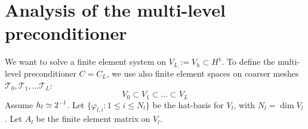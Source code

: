 








% 

\section{Analysis of the multi-level preconditioner}

We want to solve a finite element system on $V_L := V_h \subset H^1$.
To define the multi-level preconditioner $C = C_L$, we use also finite
element spaces on coarser meshes ${\mathcal T}_0, {\mathcal T}_1, \ldots
{\mathcal T}_L$:
$$
V_0 \subset V_1 \subset \ldots \subset V_L
$$
Assume $h_l \simeq 2^{-l}$. Let $\{ \varphi_{l,i} : 1 \leq i \leq N_l \}$ be the hat-basis for $V_l$, with $N_l = \operatorname{dim} V_l$. 
Let $A_l$ be the finite element matrix on $V_l$.

